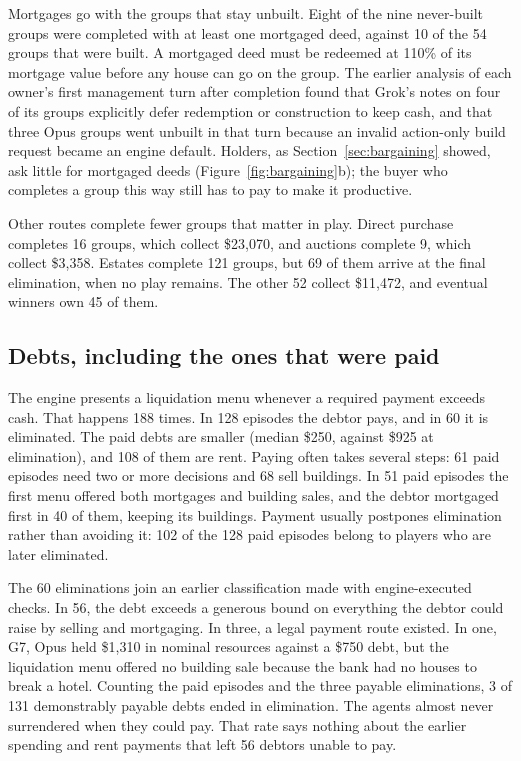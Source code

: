 Mortgages go with the groups that stay unbuilt. Eight of the nine never-built groups were completed with at least one mortgaged deed, against 10 of the 54 groups that were built. A mortgaged deed must be redeemed at 110\% of its mortgage value before any house can go on the group. The earlier analysis of each owner's first management turn after completion found that Grok's notes on four of its groups explicitly defer redemption or construction to keep cash, and that three Opus groups went unbuilt in that turn because an invalid action-only build request became an engine default. Holders, as Section~\ref{sec:bargaining} showed, ask little for mortgaged deeds (Figure~\ref{fig:bargaining}b); the buyer who completes a group this way still has to pay to make it productive.

Other routes complete fewer groups that matter in play. Direct purchase completes 16 groups, which collect \$23,070, and auctions complete 9, which collect \$3,358. Estates complete 121 groups, but 69 of them arrive at the final elimination, when no play remains. The other 52 collect \$11,472, and eventual winners own 45 of them.

\subsection{Debts, including the ones that were paid}

The engine presents a liquidation menu whenever a required payment exceeds cash. That happens 188 times. In 128 episodes the debtor pays, and in 60 it is eliminated. The paid debts are smaller (median \$250, against \$925 at elimination), and 108 of them are rent. Paying often takes several steps: 61 paid episodes need two or more decisions and 68 sell buildings. In 51 paid episodes the first menu offered both mortgages and building sales, and the debtor mortgaged first in 40 of them, keeping its buildings. Payment usually postpones elimination rather than avoiding it: 102 of the 128 paid episodes belong to players who are later eliminated.

The 60 eliminations join an earlier classification made with engine-executed checks. In 56, the debt exceeds a generous bound on everything the debtor could raise by selling and mortgaging. In three, a legal payment route existed. In one, G7, Opus held \$1,310 in nominal resources against a \$750 debt, but the liquidation menu offered no building sale because the bank had no houses to break a hotel. Counting the paid episodes and the three payable eliminations, 3 of 131 demonstrably payable debts ended in elimination. The agents almost never surrendered when they could pay. That rate says nothing about the earlier spending and rent payments that left 56 debtors unable to pay.


